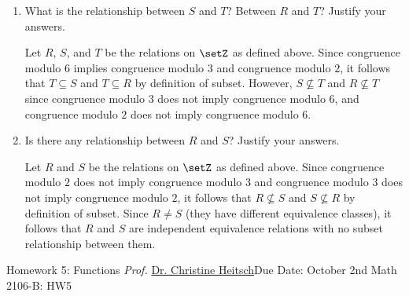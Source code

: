 \begin{enumerate}
\begin{enumerate}
\begin{subanswer}
        and the partition resulting from $T$ is a refinement of the partition resulting from $R$ by definition of .
      \end{subanswer}
    \item What is the relationship between $S$ and $T$? Between $R$ and $T$? Justify your answers.
      \begin{subanswer}
        Let $R$, $S$, and $T$ be the relations on $\setZ$ as defined above. 
        Since congruence modulo $6$ implies congruence modulo $3$ and congruence modulo $2$, 
        it follows that $T \subseteq S$ and $T \subseteq R$ by definition of subset. 
        However, $S \not\subseteq T$ and $R \not\subseteq T$ since congruence modulo $3$ does not imply congruence modulo $6$, 
        and congruence modulo $2$ does not imply congruence modulo $6$.
      \end{subanswer}
    \item Is there any relationship between $R$ and $S$? Justify your answers.
      \begin{subanswer}
        Let $R$ and $S$ be the relations on $\setZ$ as defined above. 
        Since congruence modulo $2$ does not imply congruence modulo $3$ and congruence modulo $3$ does not imply congruence modulo $2$, 
        it follows that $R \not\subseteq S$ and $S \not\subseteq R$ by definition of subset. 
        Since $R \neq S$ (they have different equivalence classes), 
        it follows that $R$ and $S$ are independent equivalence relations with no subset relationship between them.
      \end{subanswer}
  \end{enumerate}
\end{enumerate}


























\newpage{}
{Homework 5: Functions}
{\textit{Prof.} \href{https://ceheitsch.github.io/webpage/}{Dr. Christine Heitsch}}{Due Date: October 2nd}
{Math 2106-B: HW5}
\newpage






